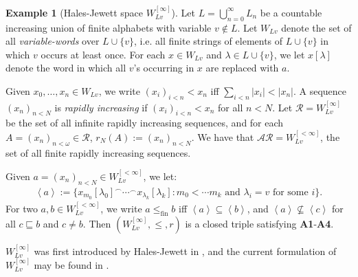 \documentclass[11pt,reqno]{amsart}
\theoremstyle{plain}
\numberwithin{equation}{section}
\theoremstyle{definition}
\newtheorem{example}[theorem]{Example}
\renewcommand{\c}[1]{\left\langle #1 \right\rangle}
\newcommand{\cal}{\mathcal}
\newcommand{\fin}{\mathrm{fin}}
\begin{document}
\begin{example}[Hales-Jewett space $W_{Lv}^{[\infty]}$]
    Let $L = \bigcup_{n=0}^\infty L_n$ be a countable increasing union of finite alphabets with variable $v \notin L$. Let $W_{Lv}$ denote the set of all \emph{variable-words} over $L \cup \{v\}$, i.e. all finite strings of elements of $L \cup \{v\}$ in which $v$ occurs at least once. For each $x \in W_{Lv}$ and $\lambda \in L \cup \{v\}$, we let $x[\lambda]$ denote the word in which all $v$'s occurring in $x$ are replaced with $a$.
    
    Given $x_0,\dots,x_n \in W_{Lv}$, we write $(x_i)_{i<n} < x_n$ iff $\sum_{i<n} |x_i| < |x_n|$. A sequence $(x_n)_{n<N}$ is \emph{rapidly increasing} if $(x_i)_{i<n} < x_n$ for all $n < N$. Let $\cal{R} = W_{Lv}^{[\infty]}$ be the set of all infinite rapidly increasing sequences, and for each $A = (x_n)_{n<\omega} \in \cal{R}$, $r_N(A) := (x_n)_{n<N}$. We have that $\cal{AR} = W_{Lv}^{[<\infty]}$, the set of all finite rapidly increasing sequences.
    
    Given $a = (x_n)_{n<N} \in W_{Lv}^{[<\infty]}$, we let:
    \begin{align*}
        \c{a} := \{x_{m_0}[\lambda_0]^\frown\cdots^\frown x_{\lambda_k}[\lambda_k] : m_0 < \cdots m_k \text{ and } \lambda_i = v \text{ for some } i\}.
    \end{align*}
    For two $a,b \in W_{Lv}^{[<\infty]}$, we write $a \leq_\fin b$ iff $\c{a} \subseteq \c{b}$, and $\c{a} \not\subseteq \c{c}$ for all $c \sqsubseteq b$ and $c \neq b$. Then $(W_{Lv}^{[\infty]},\leq,r)$ is a closed triple satisfying \textbf{A1}-\textbf{A4}.
    
    $W_{Lv}^{[\infty]}$ was first introduced by Hales-Jewett in \cite{HJ63}, and the current formulation of $W_{Lv}^{[\infty]}$ may be found in \cite{T10}.
\end{example}
\end{document}
